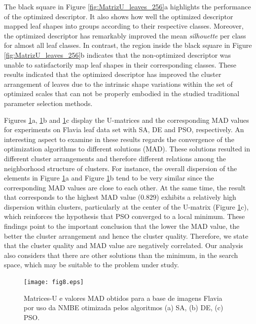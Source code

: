 {\color{red}
The black square in Figure \ref{fig:MatrizU_leaves_256}a highlights  the performance of the optimized descriptor. It also shows how well the optimized descriptor mapped leaf shapes into groups according to their respective classes.  Moreover, the optimized descriptor has remarkably improved  the mean \emph{silhouette} per class for almost all leaf classes. In contrast, the region inside the black square in Figure \ref{fig:MatrizU_leaves_256}b indicates that the non-optimized descriptor was unable to satisfactorily map leaf shapes in their corresponding classes.
These results  indicated that the optimized descriptor has improved the cluster arrangement of leaves due to the intrinsic shape variations within the set of optimized scales that can not be properly embodied in the studied traditional parameter selection methods.

Figures \ref{fig:MatrizU_leaves_II}a, \ref{fig:MatrizU_leaves_II}b and \ref{fig:MatrizU_leaves_II}c display the U-matrices and the corresponding MAD values for experiments on Flavia leaf data set with SA, DE and PSO, respectively. An interesting aspect to examine in these results regards the convergence of the optimization algorithms to different solutions (MAD). These solutions resulted in different cluster arrangements and therefore different relations among the neighborhood structure of clusters. For instance, the overall dispersion  of the elements in Figure \ref{fig:MatrizU_leaves_II}a and Figure \ref{fig:MatrizU_leaves_II}b tend to be very similar since  the corresponding MAD values are close to each other. At the same time, the result that corresponds to the highest MAD value ($0.829$) exhibits a relatively high dispersion within clusters, particularly at the center of the U-matrix (Figure \ref{fig:MatrizU_leaves_II}c), which reinforces the hypothesis that  PSO converged to a local minimum. These findings point to the important conclusion that the lower the MAD value, the better the cluster arrangement and hence the cluster quality. Therefore, we state that the cluster quality and MAD value are negatively correlated. Our analysis also considers that there are other solutions than the minimum, in the search space, which may be suitable to the problem under study. 

\begin{figure}[h!]
 \caption{\label{fig:MatrizU_leaves_II}Matrices-U e valores MAD obtidos para a base de imagens Flavia por uso da NMBE otimizada pelos algoritmos (a) SA, (b) DE, (c) PSO.}
\centering
\texttt{[image: fig8.eps]}
\end{figure}

}

